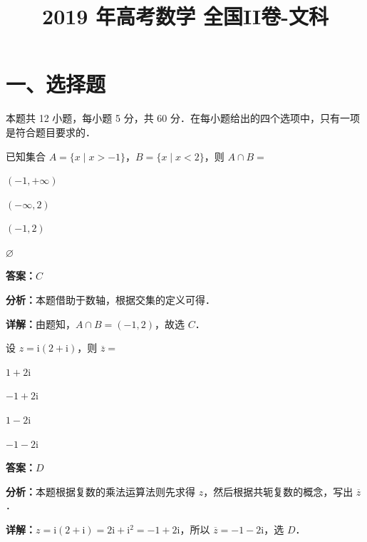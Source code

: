 ﻿\title{2019 年高考数学 全国II卷-文科}
\date{}
\maketitle

\section*{一、选择题}
本题共 12 小题，每小题 5 分，共 60 分．在每小题给出的四个选项中，只有一项是符合题目要求的．

\begin{question}[points=5]
已知集合 $A=\{x\mid x>-1\}$，$B=\{x\mid x<2\}$，则 $A\cap B=$
\begin{choices}
  \item $(-1,+\infty)$
  \item $(-\infty,2)$
  \item $(-1,2)$
  \item $\varnothing$
\end{choices}
\begin{solution}
\textbf{答案：}$C$

\textbf{分析：}本题借助于数轴，根据交集的定义可得．

\textbf{详解：}由题知，$A\cap B=(-1,2)$，故选 $C$．
\end{solution}
\end{question}

\begin{question}[points=5]
设 $z=\mathrm{i}(2+\mathrm{i})$，则 $\overline{z}=$
\begin{choices}
  \item $1+2\mathrm{i}$
  \item $-1+2\mathrm{i}$
  \item $1-2\mathrm{i}$
  \item $-1-2\mathrm{i}$
\end{choices}
\begin{solution}
\textbf{答案：}$D$

\textbf{分析：}本题根据复数的乘法运算法则先求得 $z$，然后根据共轭复数的概念，写出 $\overline{z}$．

\textbf{详解：}$z=\mathrm{i}(2+\mathrm{i})=2\mathrm{i}+\mathrm{i}^2=-1+2\mathrm{i}$，所以 $\overline{z}=-1-2\mathrm{i}$，选 $D$．
\end{solution}
\end{question}

